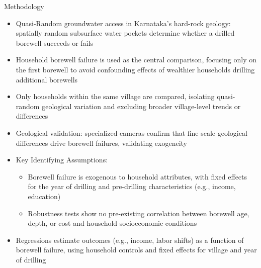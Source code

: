 \documentclass[10pt]{beamer}
\begin{document}
\begin{frame}
	{Methodology}
	\begin{itemize}
		\item Quasi-Random groundwater access in Karnataka's hard-rock geology: spatially random subsurface water pockets determine whether a drilled borewell succeeds or fails
		\item Household borewell failure is used as the central comparison, focusing only on the first borewell to avoid confounding effects of wealthier households drilling additional borewells
		\item Only households within the same village are compared, isolating quasi-random geological variation and excluding broader village-level trends or differences
		\item Geological validation: specialized cameras confirm that fine-scale geological differences drive borewell failures, validating exogeneity
		\item Key Identifying Assumptions:
		      \begin{itemize}
			      \item Borewell failure is exogenous to household attributes, with fixed effects for the year of drilling and pre-drilling characteristics (e.g., income, education)
			      \item Robustness tests show no pre-existing correlation between borewell age, depth, or cost and household socioeconomic conditions
		      \end{itemize}
		\item Regressions estimate outcomes (e.g., income, labor shifts) as a function of borewell failure, using household controls and fixed effects for village and year of drilling
	\end{itemize}
\end{frame}
\end{document}
